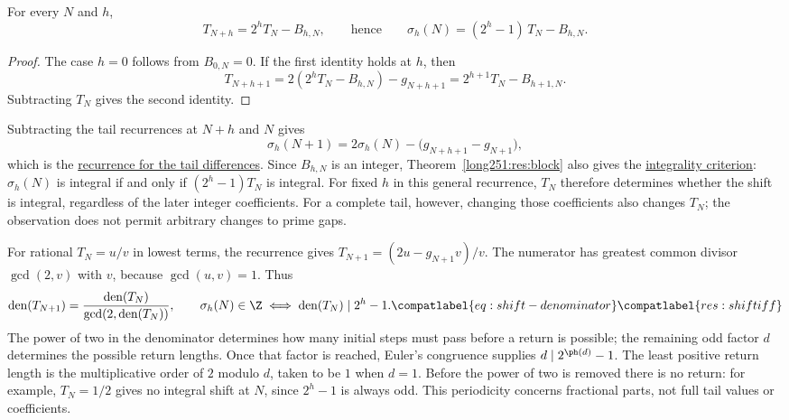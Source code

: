 \begin{theorem}\label{long251:res:block}
For every $N$ and $h$,
\[
 T_{N+h}=2^{h}T_N-B_{h,N},
 \qquad\text{hence}\qquad
 \sigma_h(N)=(2^{h}-1)\,T_N-B_{h,N} .
\]
\end{theorem}

\begin{proof}
The case $h=0$ follows from $B_{0,N}=0$.  If the first identity holds at
$h$, then
\[
 T_{N+h+1}=2(2^hT_N-B_{h,N})-g_{N+h+1}
          =2^{h+1}T_N-B_{h+1,N}.
\]
Subtracting $T_N$ gives the second identity.
\end{proof}

Subtracting the tail recurrences at $N+h$ and $N$ gives
\begin{equation}\label{long251:eq:shift-step}
 \sigma_h(N+1)=2\sigma_h(N)-\bigl(g_{N+h+1}-g_{N+1}\bigr),
\end{equation}
which is the
\href{https://github.com/wcook04/plectis-erdos/blob/3d6d938d696fed0fb71dd55115a18a73738ff223/lean/ErdosProblems/Erdos251/PrimeGapDyadicTail.lean\#L563}{recurrence for the tail differences}.
Since $B_{h,N}$ is an integer, Theorem~\ref{long251:res:block} also gives the
\href{https://github.com/wcook04/plectis-erdos/blob/3d6d938d696fed0fb71dd55115a18a73738ff223/lean/ErdosProblems/Erdos251/PrimeGapDyadicTail.lean\#L802}{integrality criterion}:
$\sigma_h(N)$ is integral if and only if $(2^h-1)T_N$ is integral.
For fixed $h$ in this general recurrence, $T_N$ therefore determines whether
the shift is integral, regardless of the later integer coefficients.
For a complete tail, however, changing those coefficients also changes
$T_N$; the observation does not permit arbitrary changes to prime gaps.

For rational $T_N=u/v$ in lowest terms, the recurrence gives
$T_{N+1}=(2u-g_{N+1}v)/v$.  The numerator has greatest common divisor
$\gcd(2,v)$ with $v$, because $\gcd(u,v)=1$.  Thus
\begin{equation}
 \operatorname{den}(T_{N+1})
 =\frac{\operatorname{den}(T_N)}{\gcd(2,\operatorname{den}(T_N))},
 \qquad
 \sigma_h(N)\in\Z
 \iff
 \operatorname{den}(T_N)\mid 2^h-1 .
\label{long251:eq:den-law}\compatlabel{eq:shift-denominator}\compatlabel{res:shiftiff}
\end{equation}
The power of two in the denominator determines how many initial steps
must pass before a return is possible; the remaining odd factor $d$
determines the possible return lengths.  Once that factor is reached,
Euler's congruence supplies $d\mid2^{\ph(d)}-1$.  The least positive
return length is the multiplicative order of $2$ modulo $d$, taken to
be $1$ when $d=1$.  Before the power of two is removed there is no return:
for example, $T_N=1/2$ gives no integral shift at $N$, since $2^h-1$ is
always odd.  This periodicity concerns fractional parts, not full tail
values or coefficients.

